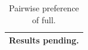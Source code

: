 \begin{table}[t]
\centering\small
\begin{tabular}{l}
\toprule
Results pending. \\
\bottomrule
\end{tabular}
\caption{Pairwise preference of full.}
\label{tab:pairwise}
\end{table}
